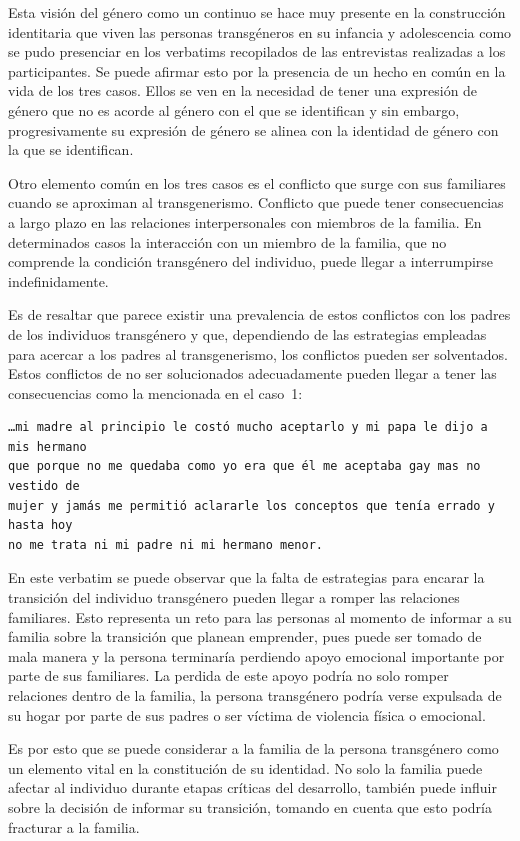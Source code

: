 Esta visión del género como un continuo se hace muy presente en la construcción
identitaria que viven las personas transgéneros en su infancia y adolescencia
como se pudo presenciar en los verbatims recopilados de las entrevistas
realizadas a los participantes. Se puede afirmar esto por la presencia de un
hecho en común en la vida de los tres casos. Ellos se ven en la necesidad de
tener una expresión de género que no es acorde al género con el que se
identifican y sin embargo, progresivamente su expresión de género se alinea con
la identidad de género con la que se identifican.

Otro elemento común en los tres casos es el conflicto que surge
con sus familiares cuando se aproximan al transgenerismo. Conflicto que
puede tener consecuencias a largo plazo en las relaciones interpersonales con
miembros de la familia. En determinados casos la interacción con un
miembro de la familia, que no comprende la condición transgénero del individuo,
puede llegar a interrumpirse indefinidamente.

Es de resaltar que parece existir una prevalencia de estos conflictos con los
padres de los individuos transgénero y que, dependiendo de las estrategias
empleadas para acercar a los padres al transgenerismo, los conflictos pueden ser
solventados. Estos conflictos de no ser solucionados adecuadamente pueden llegar
a tener las consecuencias como la mencionada en el caso~1:

\begin{verbatim}
…mi madre al principio le costó mucho aceptarlo y mi papa le dijo a mis hermano
que porque no me quedaba como yo era que él me aceptaba gay mas no vestido de
mujer y jamás me permitió aclararle los conceptos que tenía errado y hasta hoy
no me trata ni mi padre ni mi hermano menor.
\end{verbatim}

En este verbatim se puede observar que la falta de estrategias para encarar la
transición del individuo transgénero pueden llegar a romper las relaciones
familiares. Esto representa un reto para las personas al momento de informar a
su familia sobre la transición que planean emprender, pues puede ser tomado de
mala manera y la persona terminaría perdiendo apoyo emocional importante por
parte de sus familiares. La perdida de este apoyo podría no solo
romper relaciones dentro de la familia, la persona transgénero podría verse
expulsada de su hogar por parte de sus padres o ser víctima de violencia física
o emocional.

Es por esto que se puede considerar a la familia de la persona transgénero como
un elemento vital en la constitución de su identidad. No solo la familia puede
afectar al individuo durante etapas críticas del desarrollo, también puede
influir sobre la decisión de informar su transición, tomando en cuenta que esto
podría fracturar a la familia.

